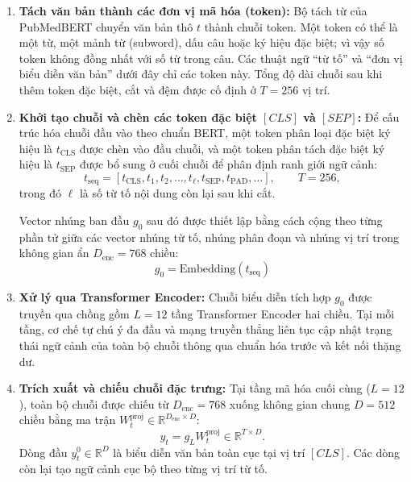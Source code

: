 \begin{enumerate}
    \item \textbf{Tách văn bản thành các đơn vị mã hóa (token):} Bộ tách từ của PubMedBERT chuyển văn bản thô $t$ thành chuỗi token. Một token có thể là một từ, một mảnh từ (subword), dấu câu hoặc ký hiệu đặc biệt; vì vậy số token không đồng nhất với số từ trong câu. Các thuật ngữ ``từ tố'' và ``đơn vị biểu diễn văn bản'' dưới đây chỉ các token này. Tổng độ dài chuỗi sau khi thêm token đặc biệt, cắt và đệm được cố định ở $T=256$ vị trí.
    
    \pagebreak

    \item \textbf{Khởi tạo chuỗi và chèn các token đặc biệt $[CLS]$ và $[SEP]$:} 
    Để cấu trúc hóa chuỗi đầu vào theo chuẩn BERT, một token phân loại đặc biệt ký hiệu là $t_{\text{CLS}}$ được chèn vào đầu chuỗi, và một token phân tách đặc biệt ký hiệu là $t_{\text{SEP}}$ được bổ sung ở cuối chuỗi để phân định ranh giới ngữ cảnh:
    \begin{equation}
    t_{\text{seq}}
    = [t_{\text{CLS}},t_1,t_2,\ldots,t_{\ell},t_{\text{SEP}},
    t_{\text{PAD}},\ldots],
    \qquad T=256,
    \end{equation}
    trong đó $\ell$ là số từ tố nội dung còn lại sau khi cắt.
    
    Vector nhúng ban đầu $g_0$ sau đó được thiết lập bằng cách cộng theo từng phần tử giữa các vector nhúng từ tố, nhúng phân đoạn và nhúng vị trí trong không gian ẩn $D_{\mathrm{enc}}=768$ chiều:
    \begin{equation}
    g_0 = \text{Embedding}(t_{\text{seq}})
    \end{equation}
    
    \item \textbf{Xử lý qua Transformer Encoder:} Chuỗi biểu diễn tích hợp $g_0$ được truyền qua chồng gồm $L = 12$ tầng Transformer Encoder hai chiều. Tại mỗi tầng, cơ chế tự chú ý đa đầu và mạng truyền thẳng liên tục cập nhật trạng thái ngữ cảnh của toàn bộ chuỗi thông qua chuẩn hóa trước và kết nối thặng dư.
    
    \item \textbf{Trích xuất và chiếu chuỗi đặc trưng:} Tại tầng mã hóa cuối cùng ($L=12$), toàn bộ chuỗi được chiếu từ $D_{\mathrm{enc}}=768$ xuống không gian chung $D=512$ chiều bằng ma trận $W_t^{\mathrm{proj}}\in\mathbb{R}^{D_{\mathrm{enc}}\times D}$:
    \begin{equation}
    y_t = g_LW_t^{\mathrm{proj}}
    \in \mathbb{R}^{T\times D}.
    \end{equation}
    Dòng đầu $y_t^0\in\mathbb{R}^{D}$ là biểu diễn văn bản toàn cục tại vị trí $[CLS]$. Các dòng còn lại tạo ngữ cảnh cục bộ theo từng vị trí từ tố.
\end{enumerate}

